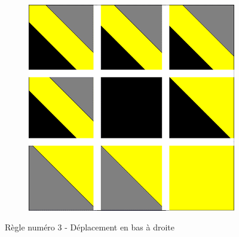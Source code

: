\documentclass[a4paper]{article}
\begin{document}
\begin{figure}[!h]
\begin{subfigure}[t]{0.17\textwidth}
    \end{subfigure}
    \hfill
    \begin{subfigure}[t]{0.17\textwidth}
        \includegraphics[width=\textwidth]{img/rule31.png}
    \end{subfigure}
    \caption{Règle numéro 3 - Déplacement en bas à droite}
\end{figure}
\end{document}

